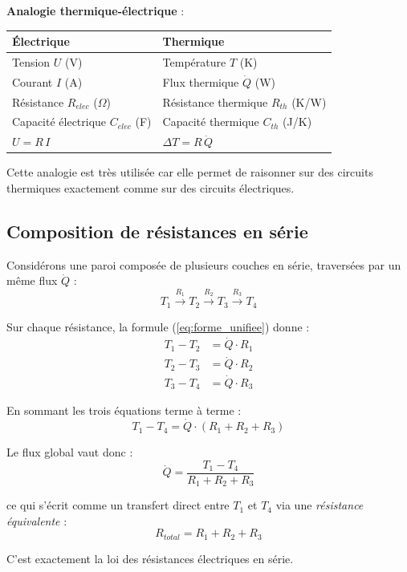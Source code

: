 \documentclass[11pt,a4paper]{article}
\begin{document}
\textbf{Analogie thermique-électrique} :

\begin{center}
\begin{tabular}{ll}
\toprule
\textbf{Électrique} & \textbf{Thermique} \\
\midrule
Tension $U$ (V) & Température $T$ (K) \\
Courant $I$ (A) & Flux thermique $\dot Q$ (W) \\
Résistance $R_{elec}$ ($\Omega$) & Résistance thermique $R_{th}$ (K/W) \\
Capacité électrique $C_{elec}$ (F) & Capacité thermique $C_{th}$ (J/K) \\
$U = R\,I$ & $\Delta T = R\,\dot Q$ \\
\bottomrule
\end{tabular}
\end{center}

Cette analogie est très utilisée car elle permet de raisonner sur des circuits thermiques
exactement comme sur des circuits électriques.

\subsection{Composition de résistances en série}

\begin{demo}
Considérons une paroi composée de plusieurs couches en série, traversées par un même flux $\dot Q$ :
$$T_1 \xrightarrow{R_1} T_2 \xrightarrow{R_2} T_3 \xrightarrow{R_3} T_4$$

Sur chaque résistance, la formule (\ref{eq:forme_unifiee}) donne :
\begin{align}
T_1 - T_2 &= \dot Q \cdot R_1 \\
T_2 - T_3 &= \dot Q \cdot R_2 \\
T_3 - T_4 &= \dot Q \cdot R_3
\end{align}

En sommant les trois équations terme à terme :
$$T_1 - T_4 = \dot Q \cdot (R_1 + R_2 + R_3)$$

Le flux global vaut donc :
$$\dot Q = \frac{T_1 - T_4}{R_1 + R_2 + R_3}$$

ce qui s'écrit comme un transfert direct entre $T_1$ et $T_4$ via une \emph{résistance
équivalente} :
\begin{equation}
\boxed{\;R_{total} = R_1 + R_2 + R_3\;}
\end{equation}

C'est exactement la loi des résistances électriques en série.
\end{demo}
\end{document}
